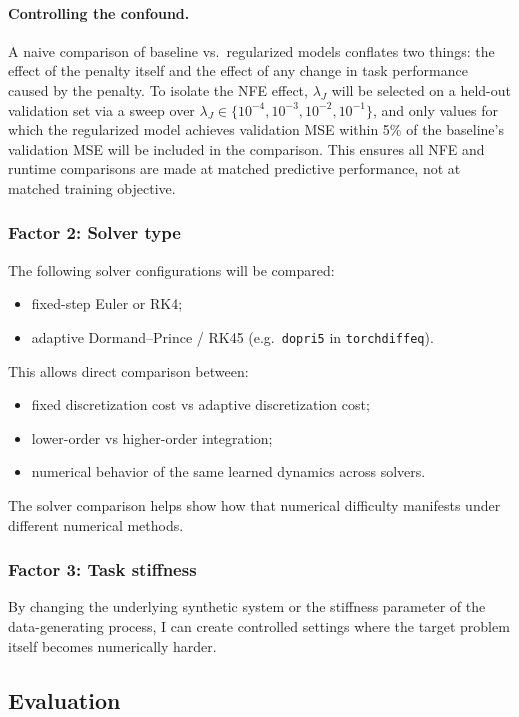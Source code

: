 \documentclass[11pt]{article}
\begin{document}
\paragraph{Controlling the confound.}
A naive comparison of baseline vs.\ regularized models conflates two things: the effect of the penalty itself and the effect of any change in task performance caused by the penalty. To isolate the NFE effect, $\lambda_J$ will be selected on a held-out validation set via a sweep over $\lambda_J \in \{10^{-4}, 10^{-3}, 10^{-2}, 10^{-1}\}$, and only values for which the regularized model achieves validation MSE within 5\% of the baseline's validation MSE will be included in the comparison. This ensures all NFE and runtime comparisons are made at matched predictive performance, not at matched training objective.

\subsubsection{Factor 2: Solver type}
The following solver configurations will be compared:
\begin{itemize}[leftmargin=2em]
    \item fixed-step Euler or RK4;
    \item adaptive Dormand--Prince / RK45 (e.g.\ \texttt{dopri5} in \texttt{torchdiffeq}).
\end{itemize}
This allows direct comparison between:
\begin{itemize}[leftmargin=2em]
    \item fixed discretization cost vs adaptive discretization cost;
    \item lower-order vs higher-order integration;
    \item numerical behavior of the same learned dynamics across solvers.
\end{itemize}
The solver comparison helps show how that numerical difficulty manifests under different numerical methods.

\subsubsection{Factor 3: Task stiffness}
By changing the underlying synthetic system or the stiffness parameter of the data-generating process, I can create controlled settings where the target problem itself becomes numerically harder.

\subsection{Evaluation}
\end{document}
